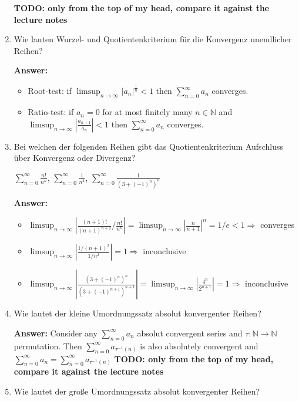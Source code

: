 \documentclass[11pt]{article}
\newcommand{\abs}[1]{\left|#1\right|}
\newcommand{\sumn}[4]{\sum_{#1=#2}^{#3}{#4}}
\begin{document}
\begin{enumerate}
    \textbf{TODO: only from the top of my head, compare it against the lecture notes}
    \item  Wie lauten Wurzel- und Quotientenkriterium für die Konvergenz unendlicher Reihen?
    
    \textbf{Answer:}
    \begin{itemize}
        \item Root-test: if $\limsup_{n\to\infty}\abs{a_n}^{\frac{1}{n}} < 1$ then $\sumn{n}{0}{\infty}{a_n}$ converges.
        \item Ratio-test: if $a_n = 0$ for at most finitely many $n\in\mathbb{N}$ and $\limsup_{n\to\infty}\abs{\frac{a_{n+1}}{a_n}} < 1$ then $\sumn{n}{0}{\infty}{a_n}$ converges.
    \end{itemize}

    \item  Bei welchen der folgenden Reihen gibt das Quotientenkriterium Aufschluss über Konvergenz oder Divergenz?
    \begin{center}
        $\sum_{n=0}^\infty \frac{n!}{n^n}$, $\sum_{n=0}^\infty \frac{1}{n^2}$, $\sum_{n=0}^\infty \frac{1}{(3+(-1)^n)^n}$
    \end{center}

    \textbf{Answer:}
    \begin{itemize}
        \item $\limsup_{n\to\infty}\abs{\frac{(n+1)!}{(n+1)^{n+1}}/\frac{n!}{n^n}} = \limsup_{n\to\infty}\abs{\frac{n}{n+1}}^n = 1/e < 1 \Rightarrow$ converges
        \item $\limsup_{n\to\infty}\abs{\frac{1/(n+1)^2}{1/n^2}} = 1 \Rightarrow$ inconclusive
        \item $\limsup_{n\to\infty}\abs{\frac{(3+(-1)^n)^n}{(3+(-1)^{n+1})^{n+1}}} = \limsup_{n\to\infty}\abs{\frac{4^n}{2^{n+1}}} = 1 \Rightarrow$ inconclusive
    \end{itemize}

    \item  Wie lautet der kleine Umordnungssatz absolut konvergenter Reihen?
    
   
    \textbf{Answer:} Consider any $\sumn{n}{0}{\infty}{a_n}$ absolut convergent series and $\tau\colon \mathbb{N} \to \mathbb{N}$ permutation. Then $\sumn{n}{0}{\infty}{a_{\tau^{-1}(n)}}$ is also absolutely convergent and $\sumn{n}{0}{\infty}{a_n} = \sumn{n}{0}{\infty}{a_{\tau^{-1}(n)}}$ \textbf{TODO: only from the top of my head, compare it against the lecture notes}

    \item  Wie lautet der große Umordnungssatz absolut konvergenter Reihen?
    

\end{enumerate}
\end{document}
